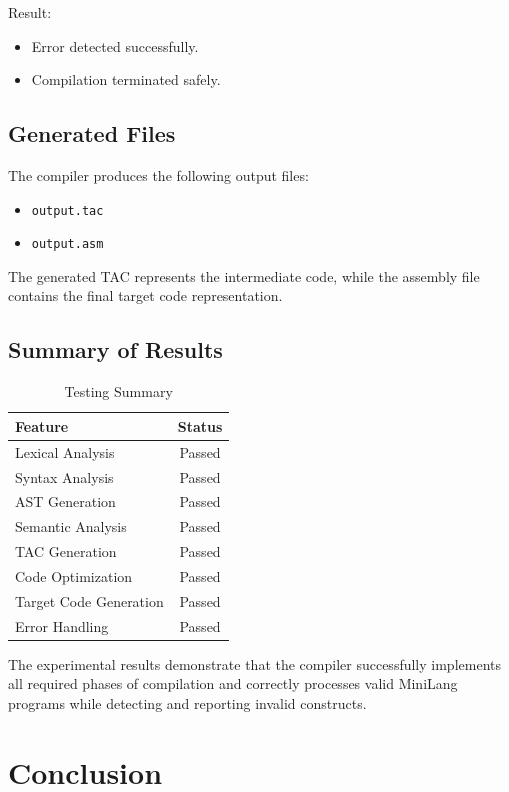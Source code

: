 \documentclass[12pt,a4paper]{report}
\begin{document}
Result:

\begin{itemize}
    \item Error detected successfully.
    \item Compilation terminated safely.
\end{itemize}

\section{Generated Files}

The compiler produces the following output files:

\begin{itemize}
    \item \texttt{output.tac}
    \item \texttt{output.asm}
\end{itemize}

The generated TAC represents the intermediate code, while the assembly file contains the final target code representation.

\section{Summary of Results}

\begin{table}[H]
\centering
\begin{tabular}{|l|c|}
\hline
Feature & Status \\
\hline
Lexical Analysis & Passed \\
Syntax Analysis & Passed \\
AST Generation & Passed \\
Semantic Analysis & Passed \\
TAC Generation & Passed \\
Code Optimization & Passed \\
Target Code Generation & Passed \\
Error Handling & Passed \\
\hline
\end{tabular}
\caption{Testing Summary}
\end{table}

The experimental results demonstrate that the compiler successfully implements all required phases of compilation and correctly processes valid MiniLang programs while detecting and reporting invalid constructs.


\chapter{Conclusion}
\end{document}
